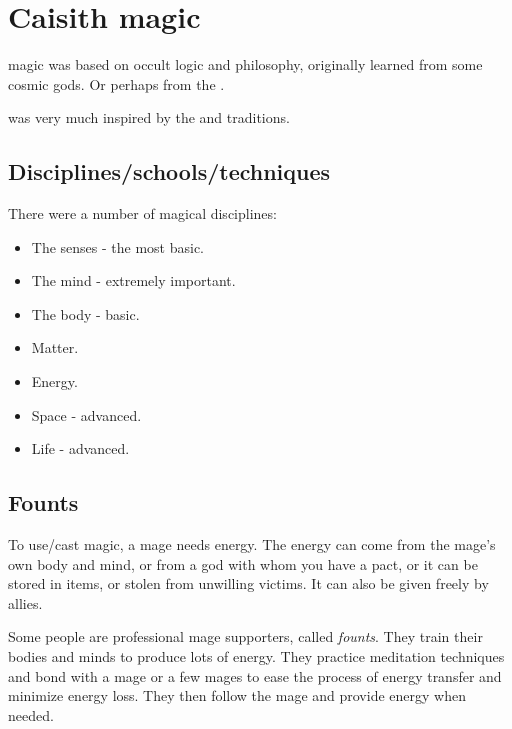 \section{Caisith magic}
\Caisith magic was based on occult logic and philosophy, originally learned from some cosmic gods. 
Or perhaps from the \voyagers. 

 was very much inspired by the \caisith and \quiljaaran traditions.









\subsection{Disciplines/schools/techniques}
There were a number of magical disciplines:

\begin{itemize}
    \item The senses - the most basic. 
    \item The mind - extremely important. 
    \item The body - basic. 
    \item Matter. 
    \item Energy.
    \item Space - advanced. 
    \item Life - advanced. 
\end{itemize}









\subsection{Founts}
To use/cast magic, a mage needs energy. The energy can come from the mage's own body and mind, or from a god with whom you have a pact, or it can be stored in items, or stolen from unwilling victims. It can also be given freely by allies. 

Some people are professional mage supporters, called \emph{founts}. They train their bodies and minds to produce lots of energy. They practice meditation techniques and bond with a mage or a few mages to ease the process of energy transfer and minimize energy loss. They then follow the mage and provide energy when needed. 

